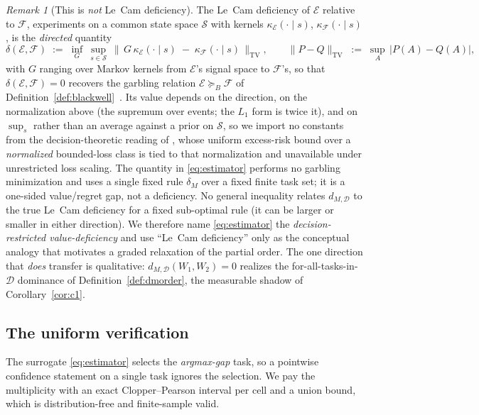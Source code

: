 \documentclass[11pt]{article}
\theoremstyle{plain}
\theoremstyle{definition}
\theoremstyle{remark}
\newtheorem{remark}{Remark}
\newcommand{\Dcal}{\mathcal{D}}
\newcommand{\Scal}{\mathcal{S}}
\newcommand{\Bord}{\succeq_{B}}
\begin{document}
\begin{remark}[This is \emph{not} Le~Cam deficiency]
\label{rem:notlecam}
The Le~Cam deficiency of $\mathcal E$ relative to $\mathcal F$, experiments on a common state
space $\Scal$ with kernels $\kappa_{\mathcal E}(\cdot\mid s)$, $\kappa_{\mathcal F}(\cdot\mid s)$,
is the \emph{directed} quantity
\[
  \delta(\mathcal E,\mathcal F) \;:=\; \inf_{G}\ \sup_{s\in\Scal}\ 
  \big\|\, G\,\kappa_{\mathcal E}(\cdot\mid s) \;-\; \kappa_{\mathcal F}(\cdot\mid s) \,\big\|_{\mathrm{TV}},
  \qquad \|P-Q\|_{\mathrm{TV}} \;:=\; \sup_{A}\,\big|P(A)-Q(A)\big|,
\]
with $G$ ranging over Markov kernels from $\mathcal E$'s signal space to $\mathcal F$'s, so that
$\delta(\mathcal E,\mathcal F)=0$ recovers the garbling relation $\mathcal E \Bord \mathcal F$ of
Definition~\ref{def:blackwell}~\citep{lecam1964,lecam1986,torgersen1991}. Its value depends on the
direction, on the normalization above (the supremum over events; the $L_1$ form is twice it), and
on $\sup_{s}$ rather than an average against a prior on $\Scal$, so we import no constants from the
decision-theoretic reading of \citet{vanrooyen2014}, whose uniform excess-risk bound over a
\emph{normalized} bounded-loss class is tied to that normalization and unavailable under
unrestricted loss scaling. The quantity in
\eqref{eq:estimator} performs no garbling minimization and uses a single fixed rule $\delta_M$ over
a fixed finite task set; it is a one-sided value/regret gap, not a deficiency. No general inequality
relates $d_{M,\Dcal}$ to the true Le~Cam deficiency for a fixed sub-optimal rule (it can be
larger or smaller in either direction). We therefore name \eqref{eq:estimator} the
\emph{decision-restricted value-deficiency} and use ``Le~Cam deficiency'' only as the conceptual
analogy that motivates a graded relaxation of the partial order. The one direction that \emph{does}
transfer is qualitative: $d_{M,\Dcal}(W_1,W_2)=0$ realizes the for-all-tasks-in-$\Dcal$ dominance
of Definition~\ref{def:dmorder}, the measurable shadow of Corollary~\ref{cor:c1}.
\end{remark}

\subsection{The uniform verification}
\label{subsec:certificate}

The surrogate \eqref{eq:estimator} selects the \emph{argmax-gap} task, so a pointwise confidence
statement on a single task ignores the selection. We pay the multiplicity with an exact
Clopper--Pearson interval per cell and a union bound, which is distribution-free and finite-sample
valid.
\end{document}
